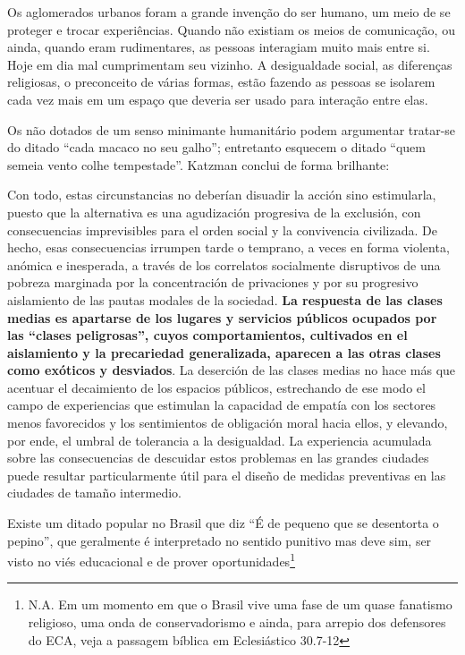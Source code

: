 \documentclass[
	12pt,				%
	openright,			%
	twoside,			%
	a4paper,			%
	chapter=TITLE,		%
	section=TITLE,		%
	subsection=TITLE,	%
	subsubsection=TITLE,%
	spanish,            %
	english,			%
	brazil				%
	]{abntex2}
\begin{document}
\par
Os aglomerados urbanos foram a grande invenção do ser humano, um meio de se proteger e trocar experiências. Quando não existiam os meios de comunicação, ou ainda, quando eram rudimentares, as pessoas interagiam muito mais entre si. Hoje em dia mal cumprimentam seu vizinho. A desigualdade social, as diferenças religiosas, o preconceito de várias formas, estão fazendo as pessoas se isolarem cada vez mais em um espaço que deveria ser usado para interação entre elas.
\par
Os não dotados de um senso minimante humanitário podem argumentar tratar-se do ditado “cada macaco no seu galho”; entretanto esquecem o ditado “quem semeia vento colhe tempestade”. Katzman conclui de forma brilhante:
\begin{citacao}[spanish]
Con todo, estas circunstancias no deberían disuadir la acción sino estimularla, puesto que la alternativa es una
agudización progresiva de la exclusión, con consecuencias imprevisibles para el orden social y la convivencia civilizada. De hecho, esas consecuencias irrumpen tarde o temprano, a veces en forma violenta, anómica e inesperada, a través de los correlatos socialmente
disruptivos de una pobreza marginada por la concentración de privaciones y por su progresivo aislamiento de
las pautas modales de la sociedad. \textbf{La respuesta de las clases medias es apartarse de los lugares y servicios
públicos ocupados por las “clases peligrosas”, cuyos comportamientos, cultivados en el aislamiento y la precariedad generalizada, aparecen a las otras clases como exóticos y desviados}. La deserción de las clases medias
no hace más que acentuar el decaimiento de los espacios públicos, estrechando de ese modo el campo de
experiencias que estimulan la capacidad de empatía con los sectores menos favorecidos y los sentimientos de
obligación moral hacia ellos, y elevando, por ende, el umbral de tolerancia a la desigualdad. La experiencia
acumulada sobre las consecuencias de descuidar estos problemas en las grandes ciudades puede resultar particularmente útil para el diseño de medidas preventivas en las ciudades de tamaño intermedio.\cite[p. ~187, grifo do autor]{Katzman}
\end{citacao}
\par		
Existe um ditado popular no Brasil que
diz “É de pequeno que se desentorta o pepino”, que geralmente é interpretado no sentido punitivo mas deve
sim, ser visto no viés educacional e de prover oportunidades\footnote{N.A. Em um momento em que o Brasil vive uma fase de um quase fanatismo religioso, uma onda de conservadorismo e ainda, para arrepio dos defensores do ECA, veja a passagem bíblica em Eclesiástico 30.7-12}
\end{document}
